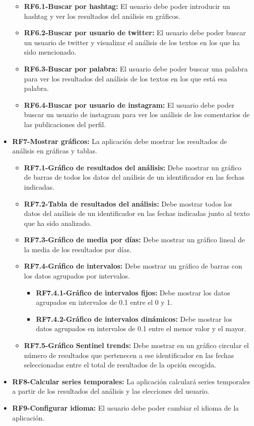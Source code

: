 \begin{itemize}
        \begin{itemize}
        \tightlist
            \item \textbf{RF6.1-Buscar por hashtag:} El usuario debe poder introducir un hashtag y ver los resultados del análisis en gráficos.
            \item \textbf{RF6.2-Buscar por usuario de twitter:} El usuario debe poder buscar un usuario de twitter y visualizar el análisis de los textos en los que ha sido mencionado.
            \item\textbf{RF6.3-Buscar por palabra:} El usuario debe poder buscar una palabra para ver los resultados del análisis de los textos en los que está esa palabra.
            \item\textbf{RF6.4-Buscar por usuario de instagram:} El usuario debe poder buscar un usuario de instagram para ver los análisis de los comentarios de las publicaciones del perfil.
        \end{itemize}
        \item \textbf{RF7-Mostrar gráficos:} La aplicación debe mostrar los resultados de análisis en gráficas y tablas.
        \begin{itemize}
        \tightlist
            \item \textbf{RF7.1-Gráfico de resultados del análisis:} Debe mostrar un gráfico de barras de todos los datos del análisis de un identificador en las fechas indicadas.
            \item\textbf{RF7.2-Tabla de resultados del análisis:} Debe mostrar todos los datos del análisis de un identificador en las fechas indicadas junto al texto que ha sido analizado.
            \item\textbf{RF7.3-Gráfico de media por días:} Debe mostrar un gráfico lineal de la media de los resultados por días.
            \item\textbf{RF7.4-Gráfico de intervalos:} Debe mostrar un gráfico de barras con los datos agrupados por intervalos.
            \begin{itemize}
                \item\textbf{RF7.4.1-Gráfico de intervalos fijos:} Debe mostrar los datos agrupados en intervalos de 0.1 entre el 0 y 1.
                \item\textbf{RF7.4.2-Gráfico de intervalos dinámicos:} Debe mostrar los datos agrupados en intervalos de 0.1 entre el menor valor y el mayor.
            \end{itemize}
            \item\textbf{RF7.5-Gráfico Sentinel trends:} Debe mostrar en un gráfico circular el número de resultados que pertenecen a ese identificador en las fechas seleccionadas entre el total de resultados de la opción escogida.
        \end{itemize}
        \item\textbf{RF8-Calcular series temporales:} La aplicación calculará series temporales a partir de los resultados del análisis y las elecciones del usuario. 
        \item\textbf{RF9-Configurar idioma:} El usuario debe poder cambiar el idioma de la aplicación.
\end{itemize}

